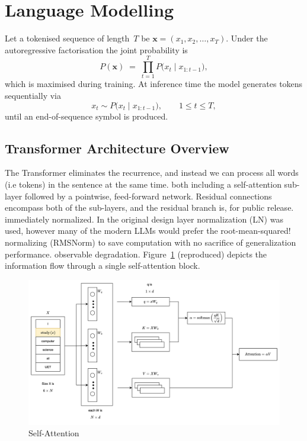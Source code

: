 \section{Language Modelling}\label{sec:lm}

Let a tokenised sequence of length~$T$ be
$\mathbf{x}=(x_{1},x_{2},\dots,x_{T})$.
Under the autoregressive factorisation the joint probability is
\begin{equation}
  P(\mathbf{x})
  \;=\;
  \prod_{t=1}^{T}
  P\!\bigl(x_{t}\mid x_{1{:}t-1}\bigr),
  \label{eq:lm}
\end{equation}
which is maximised during training.
At inference time the model generates tokens sequentially via
\begin{equation}
  x_{t}\sim
  P\!\bigl(x_{t}\mid x_{1{:}t-1}\bigr),
  \qquad
  1\le t\le T,
  \label{eq:lm_next}
\end{equation}
until an end-of-sequence symbol is produced.

\subsection{Transformer Architecture Overview}\label{sec:trf_overview}

The Transformer eliminates the recurrence, and instead we can process all words (i.e tokens) in the sentence at the same time.
both including a self-attention sub-layer followed by a pointwise,
feed-forward network.
Residual connections encompass both of the sub-layers, and the residual branch is, for public release.
immediately normalized.
In the original design layer normalization (LN) was used, however many of the
modern LLMs would prefer the root-mean-squared!
normalizing (RMSNorm) to save computation with no sacrifice of generalization performance.
observable degradation.
Figure~\ref{fig:self_attention} (reproduced) depicts the information
flow through a single self-attention block.
\begin{figure}[h]
    \centering
    \includegraphics[width=1\linewidth]{figures/c2/self_attention.png}
    \caption{Self-Attention}
    \label{fig:self_attention}
\end{figure}
